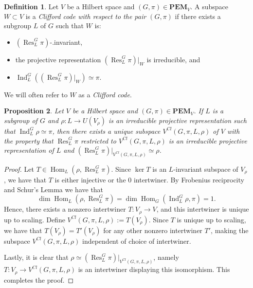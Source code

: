 \documentclass[11pt, oneside, reqno]{amsart}
\newcommand{\PEM}{\mathbf{PEM}}
\newcommand{\Hom}{\operatorname{Hom}}
\newcommand{\Res}{\operatorname{Res}}
\newcommand{\Ind}{\operatorname{Ind}}
\theoremstyle{definition}
\newtheorem{definition}{Definition}[section]
\theoremstyle{plain}
\newtheorem{proposition}[definition]{Proposition}
\theoremstyle{remark}
\begin{document}
\begin{definition}\label{def:Clifford code}
    Let $V$ be a Hilbert space and $(G,\pi) \in \PEM_V$. A subspace $W \subset V$ is a \emph{Clifford code with respect to the pair $(G,\pi)$} if there exists a subgroup $L$ of $G$ such that $W$ is:
    \begin{itemize}
        \item $(\Res^G_L\pi)$-.invariant,
        \item the projective representation $(\Res^G_L\pi)|_W$ is irreducible, and
        \item $\Ind^G_L((\Res^G_L\pi)|_W) \simeq \pi$.
    \end{itemize}
    We will often refer to $W$ as a \emph{Clifford code}.
\end{definition}

\begin{proposition}\label{prop:abstract Clifford code}
    Let $V$ be a Hilbert space and $(G,\pi) \in \PEM_V$. If $L$ is a subgroup of $G$ and $\rho \colon L \to U(V_\rho)$ is an irreducible projective representation such that $\Ind^G_L\rho \simeq \pi$, then there exists a unique subspace $V^{Cl}(G,\pi,L,\rho)$ of $V$ with the property that $\Res^G_L\pi$ restricted to $V^{Cl}(G,\pi,L,\rho)$ is an irreducible projective representation of $L$ and $(\Res^G_L\pi)|_{V^{Cl}(G,\pi,L,\rho)} \simeq \rho$. 
\end{proposition}
\begin{proof}
    Let $T \in \Hom_L(\rho, \Res^G_L\pi)$. Since $\ker T$ is an $L$-invariant subspace of $V_\rho$, we have that $T$ is either injective or the $0$ intertwiner. By Frobenius reciprocity and Schur's Lemma we have that
    \begin{equation*}
        \dim\Hom_L(\rho,\Res^G_L\pi) = \dim\Hom_G(\Ind^G_L\rho,\pi) = 1.
    \end{equation*}
    Hence, there exists a nonzero intertwiner $T \colon V_\rho \to V$, and this intertwiner is unique up to scaling. Define $V^{Cl}(G,\pi,L,\rho) := T(V_\rho)$. Since $T$ is unique up to scaling, we have that $T(V_\rho) = T'(V_\rho)$ for any other nonzero intertwiner $T'$, making the subspace $V^{Cl}(G,\pi,L,\rho)$ independent of choice of intertwiner.

    Lastly, it is clear that $\rho \simeq (\Res^G_L\pi)|_{V^{Cl}(G,\pi,L,\rho)}$, namely $T \colon V_\rho \to V^{Cl}(G,\pi,L,\rho)$ is an intertwiner displaying this isomorphism. This completes the proof.
\end{proof}
\end{document}
